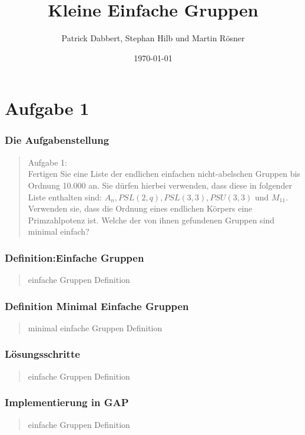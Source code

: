 \documentclass{beamer}
\title{Kleine Einfache Gruppen}
\author{Patrick Dabbert, Stephan Hilb und Martin R\"osner}
\date{\today}
\begin{document}
\begin{frame}
	\titlepage
\end{frame}


\section{Aufgabe 1}

\begin{frame}
	\frametitle{Die Aufgabenstellung}
	\begin{quote}
	Aufgabe 1:\\
	Fertigen Sie eine Liste der endlichen einfachen nicht-abelschen Gruppen bis Ordnung 10.000 an.
	Sie dürfen hierbei verwenden, dass diese in folgender Liste enthalten sind: $A_n, PSL(2,q), PSL(3,3),
	PSU(3,3)$ und $M_{11}$. Verwenden sie, dass die Ordnung eines endlichen Körpers eine Primzahlpotenz ist.
	Welche der von ihnen gefundenen Gruppen sind minimal einfach?
		 
	\end{quote}
\end{frame}



\begin{frame}
	\frametitle{Definition:Einfache Gruppen}
	\begin{quote}
	 einfache Gruppen Definition
		 
	\end{quote}
\end{frame}
\begin{frame}
	\frametitle{Definition Minimal Einfache Gruppen}
	\begin{quote}
	 minimal einfache Gruppen Definition
		 
	\end{quote}
\end{frame}

\begin{frame}
	\frametitle{Lösungsschritte}
	\begin{quote}
	 einfache Gruppen Definition
		 
	\end{quote}
\end{frame}

\begin{frame}
	\frametitle{Implementierung in GAP}
	\begin{quote}
	 einfache Gruppen Definition
		 
	\end{quote}
\end{frame}
\end{document}
